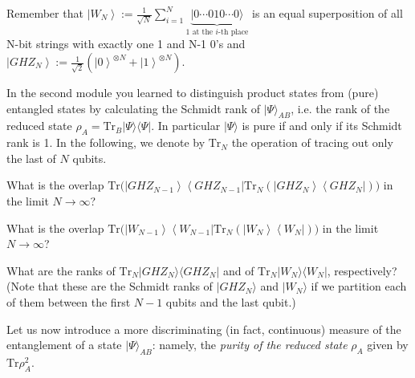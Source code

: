 \documentclass[a4paper,10pt,landscape,twocolumn]{scrartcl}
\newcommand{\ket}[1]{| #1 \rangle}
\newcommand{\bra}[1]{\langle #1 |}
\newcommand{\Tr}{\text{Tr}}
\begin{document}
\begin{exercise}

Remember that $\left| W_ N \right\rangle := \frac{1}{\sqrt{N}}\sum_{i=1}^N \underset{1\text{ at the $i$-th place}}{\underbrace{\ket{0\cdots 010\cdots 0}}}$ is an equal superposition of all N-bit strings with exactly one 1 and N-1 0's and
$\left| GHZ_ N \right\rangle :=\frac{1}{\sqrt {2}} (\left| 0 \right\rangle ^{\otimes N}+\left| 1 \right\rangle ^{\otimes N})$.

In the second module you learned to distinguish product states from (pure) entangled states by calculating the Schmidt rank of $\ket{\Psi}_{AB}$, i.e. the rank of the reduced state $\rho_A=\Tr_B \ket{\Psi}\bra{\Psi}$. In particular $\ket{\Psi}$ is pure if and only if its Schmidt rank is 1. In the following, we denote by $\Tr_N$ the operation of tracing out only the last of $N$ qubits.


\begin{subex}
What is the overlap $\text{Tr}\Big(\left| GHZ_{N-1} \right\rangle\left\langle {GHZ_{N-1}}\right| \text {Tr}_ N\left(\left| GHZ_ N \right\rangle \left\langle GHZ_ N \right|\right)\Big)$ in the limit $N \rightarrow \infty$? 
\end{subex}

\begin{subex}
What is the overlap $\text{Tr}\Big(\left| W_{N-1} \right\rangle \left\langle {W_{N-1}}\right| \text {Tr}_ N\left(\left| W_ N \right\rangle \left\langle W_N \right|\right)\Big)$ in the limit $N \rightarrow \infty$? 
\end{subex}


\begin{subex}
What are the ranks of $\Tr_N \ket{GHZ_N}\bra{GHZ_N}$ and of $\Tr_N \ket{W_N}\bra{W_N}$, respectively? (Note that these are the Schmidt ranks of $ \ket{GHZ_N}$ and  $\ket{W_N}$ if we partition each of them between the first $N-1$ qubits and the last qubit.)
\end{subex}

\begin{subex}
Let us now introduce a more discriminating (in fact, continuous) measure of the entanglement of a state $\ket{\Psi}_{AB}$: namely, the \emph{purity of the reduced state} $\rho_A$ given by $\Tr \rho_A^2$. 


\end{subex}
\end{exercise}
\end{document}
